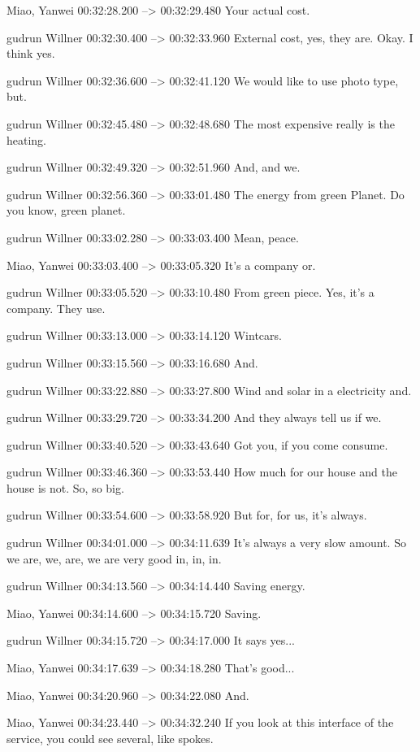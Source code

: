{Miao, Yanwei 00:32:28.200 --> 00:32:29.480
Your actual cost.

gudrun Willner 00:32:30.400 --> 00:32:33.960
External cost, yes, they are. Okay. I think yes.

gudrun Willner 00:32:36.600 --> 00:32:41.120
We would like to use photo type, but.

gudrun Willner 00:32:45.480 --> 00:32:48.680
The most expensive really is the heating.

gudrun Willner 00:32:49.320 --> 00:32:51.960
And, and we.

gudrun Willner 00:32:56.360 --> 00:33:01.480
The energy from green Planet. Do you know, green planet.

gudrun Willner 00:33:02.280 --> 00:33:03.400
Mean, peace.

Miao, Yanwei 00:33:03.400 --> 00:33:05.320
It's a company or.

gudrun Willner 00:33:05.520 --> 00:33:10.480
From green piece. Yes, it's a company. They use.

gudrun Willner 00:33:13.000 --> 00:33:14.120
Wintcars.

gudrun Willner 00:33:15.560 --> 00:33:16.680
And.

gudrun Willner 00:33:22.880 --> 00:33:27.800
Wind and solar in a electricity and.

gudrun Willner 00:33:29.720 --> 00:33:34.200
And they always tell us if we.

gudrun Willner 00:33:40.520 --> 00:33:43.640
Got you, if you come consume.

gudrun Willner 00:33:46.360 --> 00:33:53.440
How much for our house and the house is not. So, so big.

gudrun Willner 00:33:54.600 --> 00:33:58.920
But for, for us, it's always.

gudrun Willner 00:34:01.000 --> 00:34:11.639
It's always a very slow amount. So we are, we, are, we are very good in, in, in.

gudrun Willner 00:34:13.560 --> 00:34:14.440
Saving energy.

Miao, Yanwei 00:34:14.600 --> 00:34:15.720
Saving.

gudrun Willner 00:34:15.720 --> 00:34:17.000
It says yes...

Miao, Yanwei 00:34:17.639 --> 00:34:18.280
That's good...

Miao, Yanwei 00:34:20.960 --> 00:34:22.080
And.

Miao, Yanwei 00:34:23.440 --> 00:34:32.240
If you look at this interface of the service, you could see several, like spokes.

}
